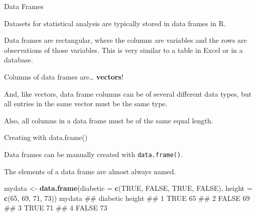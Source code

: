\documentclass[ignorenonframetext,]{beamer}
\newenvironment{Shaded}{\begin{snugshade}}{\end{snugshade}}
\newcommand{\KeywordTok}[1]{\textcolor[rgb]{0.13,0.29,0.53}{\textbf{#1}}}
\newcommand{\DataTypeTok}[1]{\textcolor[rgb]{0.13,0.29,0.53}{#1}}
\newcommand{\DecValTok}[1]{\textcolor[rgb]{0.00,0.00,0.81}{#1}}
\newcommand{\StringTok}[1]{\textcolor[rgb]{0.31,0.60,0.02}{#1}}
\newcommand{\OtherTok}[1]{\textcolor[rgb]{0.56,0.35,0.01}{#1}}
\newcommand{\NormalTok}[1]{#1}
\begin{document}
\begin{frame}{Data Frames}

Datasets for statistical analysis are typically stored in data frames in
R.

Data frames are rectangular, where the columns are variables and the
rows are observations of those variables. This is very similar to a
table in Excel or in a database.

Columns of data frames are\ldots{} \textbf{vectors}!

And, like vectors, data frame columns can be of several different data
types, but all entries in the same vector must be the same type.

Also, all columns in a data frame must be of the same equal length.

\end{frame}

\begin{frame}[fragile]{Creating with data.frame()}

Data frames can be manually created with \texttt{data.frame()}.

The elements of a data frame are almost always named.

\begin{Shaded}
\begin{Highlighting}[]
\NormalTok{mydata <-}\StringTok{ }\KeywordTok{data.frame}\NormalTok{(}\DataTypeTok{diabetic =} \KeywordTok{c}\NormalTok{(}\OtherTok{TRUE}\NormalTok{, }\OtherTok{FALSE}\NormalTok{, }\OtherTok{TRUE}\NormalTok{, }\OtherTok{FALSE}\NormalTok{), }
                     \DataTypeTok{height =} \KeywordTok{c}\NormalTok{(}\DecValTok{65}\NormalTok{, }\DecValTok{69}\NormalTok{, }\DecValTok{71}\NormalTok{, }\DecValTok{73}\NormalTok{))}
\NormalTok{mydata}
\NormalTok{##   diabetic height}
\NormalTok{## 1     TRUE     65}
\NormalTok{## 2    FALSE     69}
\NormalTok{## 3     TRUE     71}
\NormalTok{## 4    FALSE     73}
\end{Highlighting}
\end{Shaded}

\end{frame}
\end{document}

